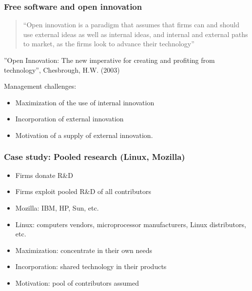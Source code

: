 \begin{frame}
\frametitle{Free software and open innovation}

\begin{quote}
``Open innovation is a paradigm that assumes that firms can and should use external ideas as well as internal ideas, and internal and external paths to market, as the firms look to advance their technology''
\end{quote}

\begin{flushright}
''Open Innovation: The new imperative for creating and profiting from technology'', Chesbrough, H.W. (2003)
\end{flushright}

Management challenges:

\begin{itemize}
\item Maximization of the use of internal innovation
\item Incorporation of external innovation
\item Motivation of a supply of external innovation. 
\end{itemize}

\end{frame}


\begin{frame}
\frametitle{Case study: Pooled research (Linux, Mozilla)}

\begin{itemize}
\item Firms donate R\&D
\item Firms exploit pooled R\&D of all contributors
\item Mozilla: IBM, HP, Sun, etc.
\item Linux: computers vendors, microprocessor manufacturers, Linux distributors, etc.
\item Maximization: concentrate in their own needs
\item Incorporation: shared technology in their products
\item Motivation: pool of contributors assumed
\end{itemize}

\end{frame}


